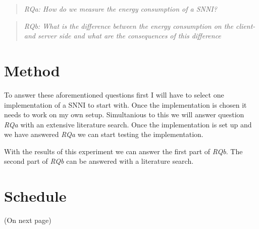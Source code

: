 \documentclass{uva-inf-article}
\begin{document}
\begin{quote} \emph{RQa: How do we measure the energy consumption of a SNNI?} \end{quote}
\begin{quote} \emph{RQb: What is the difference between the energy consumption on the client- and  server side and what are the consequences of this difference} \end{quote}

\section{Method}
To answer these aforementioned questions first I will have to select one implementation of a SNNI to start with. Once the implementation is chosen it needs to work on my own setup. Simultanious to this we will answer question \textit{RQa} with an extensive literature search. Once the implementation is set up and we have answered \textit{RQa} we can start testing the implementation.

With the results of this experiment we can answer the first part of \textit{RQb}. The second part of \textit{RQb} can be answered with a literature search. 


\section{Schedule}
(On next page)




\newpage
\printbibliography
\end{document}
